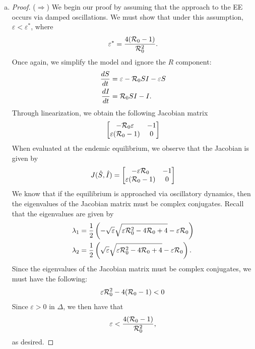 \documentclass[12pt]{article}\usepackage[]{graphicx}\usepackage[]{color}
\begin{document}
\begin{enumerate}[(a)]
\item \SIRh
{\color{blue}\begin{proof}{\color{magenta}
($\Longrightarrow$) We begin our proof by assuming that the approach to the EE occurs via damped oscillations. We must show that under this assumption, $\varepsilon < \varepsilon^{\ast}$, where
$$\varepsilon^{\ast} = \frac{4({\cal R}_0 - 1)}{{\cal R}_0^2}.$$
Once again, we simplify the model and ignore the $R$ component:
\begin{equation*}
\begin{aligned}
\frac{dS}{dt} &= \varepsilon - {\cal R}_0 SI - \varepsilon S \\
\frac{dI}{dt} &= {\cal R}_0 SI - I.
\end{aligned}
\end{equation*}
Through linearization, we obtain the following Jacobian matrix
\begin{equation}
\begin{bmatrix}
-{\cal R}_0\varepsilon & -1\\
\varepsilon({\cal R}_0-1) & 0
\end{bmatrix}
\end{equation}
When evaluated at the endemic equilibrium, we observe that the Jacobian is given by
\begin{equation} \label{Jacobian}
J(\Hat{S}, \Hat{I}) = 
\begin{bmatrix}  
-\varepsilon {\cal R}_0 & -1 \\
\varepsilon ({\cal R}_0 - 1) & 0\\
\end{bmatrix}
\end{equation}
We know that if the equilibrium is approached via oscillatory dynamics, then the eigenvalues of the Jacobian matrix must be complex conjugates. 
Recall that the eigenvalues are given by
$$
\begin{aligned}
\lambda_1 &= \frac{1}{2} \left(- \sqrt{\varepsilon} \sqrt{\varepsilon{\cal R}_0^2 - 4 {\cal R}_0 + 4} - \varepsilon {\cal R}_0\right)\\
\lambda_2 &= \frac{1}{2}\left(\sqrt{\varepsilon} \sqrt{\varepsilon{\cal R}_0^2 - 4 {\cal R}_0 + 4} - \varepsilon {\cal R}_0\right).
\end{aligned}
$$
Since the eigenvalues of the Jacobian matrix must be complex conjugates, we must have the following:
\begin{equation*}
\varepsilon {\cal R}_0 ^2 - 4({\cal R}_0 - 1) < 0 
\end{equation*}
Since $\varepsilon > 0$ in $\Delta$, we then have that
\begin{equation*}
\varepsilon < \frac{4({\cal R}_0 - 1)}{{\cal R}_0 ^2},
\end{equation*}
as desired.


}
\end{proof}}
\end{enumerate}
\end{document}
